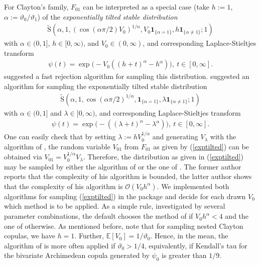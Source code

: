 \documentclass[nojss,article]{jss}
\theoremstyle{mythmstyle}
\newcommand*{\I}{\mathbf{1}}
\newcommand*{\IE}{\mathbb{E}}
\newcommand*{\tS}{\operatorname*{\tilde{S}}}
\newcommand*{\vt}{\vartheta}
\renewcommand*{\O}{\mathcal{O}}
\newcommand*{\textcite}[2][]{\citet[#1]{#2}}
\begin{document}
For Clayton's family, $F_{01}$ can be interpreted as a special case (take
$h:=1$, $\alpha:=\vt_0/\vt_1$) of the \textit{exponentially tilted stable
  distribution}
\begin{align}
  \tS(\alpha,1,(\cos(\alpha\pi/2)V_0)^{1/\alpha},V_0\I_{\{\alpha=1\}},h\I_{\{\alpha\neq1\}};1)\label{exptilted}
\end{align}
with $\alpha\in(0,1]$, $h\in[0,\infty)$, and $V_0\in(0,\infty)$, and
corresponding Laplace-Stieltjes transform
\begin{align*}
  \psi(t)=\exp\bigl(-V_0((h+t)^{\alpha}-h^{\alpha})\bigr),\ t\in[0,\infty].
\end{align*}
\textcite{hofert2010a} suggested a fast rejection algorithm for sampling this
distribution. \textcite{devroye2009} suggested an algorithm for
sampling the exponentially tilted stable distribution
\begin{align*}
  \tS(\alpha,1,\cos(\alpha\pi/2)^{1/\alpha},\I_{\{\alpha=1\}},\lambda\I_{\{\alpha\neq1\}};1)
\end{align*}
with $\alpha\in(0,1]$ and $\lambda\in[0,\infty)$, and corresponding
Laplace-Stieltjes transform
\begin{align*}
  \psi(t)=\exp\bigl(-((\lambda+t)^{\alpha}-\lambda^{\alpha})\bigr),\ t\in[0,\infty].
\end{align*}
One can easily check that by setting $\lambda:=hV_0^{1/\alpha}$ and
generating $V_\lambda$ with the algorithm of \textcite{devroye2009}, the
random variable $V_{01}$ from $F_{01}$ as given by (\ref{exptilted}) can be
obtained via $V_{01}=V_0^{1/\alpha}V_\lambda$. Therefore, the distribution as
given in (\ref{exptilted}) may be sampled by either the algorithm of
\textcite{devroye2009} or the one of \textcite{hofert2010a}. The former
author reports that the complexity of his algorithm is bounded, the latter
author shows that the complexity of his algorithm is $\O(V_{0}h^{\alpha})$.
We implemented both algorithms for sampling (\ref{exptilted}) in the package
 and decide for each drawn $V_0$ which method is to be
applied. As a simple rule, investigated by several parameter combinations,
the default chooses the method of \textcite{hofert2010a} if
$V_{0}h^{\alpha}<4$ and the one of \textcite{devroye2009} otherwise. As
mentioned before, note that for sampling nested Clayton copulas, we have
$h=1$. Further, $\IE[V_0]=1/\vt_0$. Hence, in the mean, the algorithm of
\textcite{hofert2010a} is more often applied if $\vt_0>1/4$,
equivalently, if Kendall's tau for the bivariate Archimedean copula
generated by $\psi_0$ is greater than $1/9$.
\end{document}
